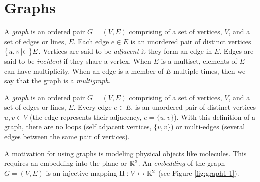 \section{Graphs}
A \textit{graph} is an ordered pair $G = (V,E)$ comprising of a set of vertices, $V$, and a set of edges or lines, $E$.  Each edge $e \in E$ is an unordered pair of distinct vertices ${\left\lbrace \left. u,v \left\vert \in \right.\right.\right\rbrace } E$.  Vertices are said to be \textit{adjacent} it they form an edge in $E$. Edges are said to be \textit{incident} if they share a vertex.  When $E$ is a multiset, elements of $E$ can have multiplicity.  When an edge is a member of $E$ multiple times, then we say that the graph is a \textit{multigraph}.   





A \textit{graph} is an 
ordered pair $G = (V,E)$ comprising of a set of vertices, $V$, and a set of edges or 
lines, $E$.  Every edge $e \in E$, is an unordered pair of distinct vertices $u,v \in V$ (the edge represents their adjacency, $e = \{ u,v\}$). With this definition of a graph, there 
are 
no loops (self adjacent vertices, $\{v,v\}$) or multi-edges (several edges between the same pair of 
vertices).

A motivation for using graphs is modeling physical objects like molecules.  This requires an 
embedding into the plane or ${\mathbb{R}}^3$.  An \textit{embedding} of the 
graph $G = (V,E)$ is an injective mapping $\Pi : V \mapsto {\mathbb{R}}^{2}$ (see Figure 
\ref{fig:graph1-1}). 

